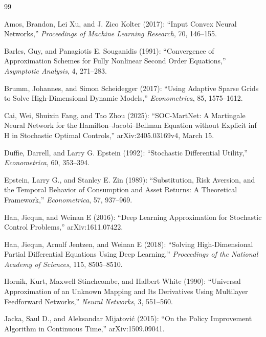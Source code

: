 \begin{thebibliography}{99}

Amos, Brandon, Lei Xu, and J. Zico Kolter (2017): ``Input Convex Neural Networks,'' \emph{Proceedings of Machine Learning Research}, 70, 146--155.

Barles, Guy, and Panagiotis E. Souganidis (1991): ``Convergence of Approximation Schemes for Fully Nonlinear Second Order Equations,'' \emph{Asymptotic Analysis}, 4, 271--283.

Brumm, Johannes, and Simon Scheidegger (2017): ``Using Adaptive Sparse Grids to Solve High-Dimensional Dynamic Models,'' \emph{Econometrica}, 85, 1575--1612.

Cai, Wei, Shuixin Fang, and Tao Zhou (2025): ``SOC-MartNet: A Martingale Neural Network for the Hamilton--Jacobi--Bellman Equation without Explicit inf H in Stochastic Optimal Controls,'' arXiv:2405.03169v4, March 15.

Duffie, Darrell, and Larry G. Epstein (1992): ``Stochastic Differential Utility,'' \emph{Econometrica}, 60, 353--394.

Epstein, Larry G., and Stanley E. Zin (1989): ``Substitution, Risk Aversion, and the Temporal Behavior of Consumption and Asset Returns: A Theoretical Framework,'' \emph{Econometrica}, 57, 937--969.

Han, Jiequn, and Weinan E (2016): ``Deep Learning Approximation for Stochastic Control Problems,'' arXiv:1611.07422.

Han, Jiequn, Arnulf Jentzen, and Weinan E (2018): ``Solving High-Dimensional Partial Differential Equations Using Deep Learning,'' \emph{Proceedings of the National Academy of Sciences}, 115, 8505--8510.

Hornik, Kurt, Maxwell Stinchcombe, and Halbert White (1990): ``Universal Approximation of an Unknown Mapping and Its Derivatives Using Multilayer Feedforward Networks,'' \emph{Neural Networks}, 3, 551--560.

Jacka, Saul D., and Aleksandar Mijatovi\'c (2015): ``On the Policy Improvement Algorithm in Continuous Time,'' arXiv:1509.09041.


\end{thebibliography}
